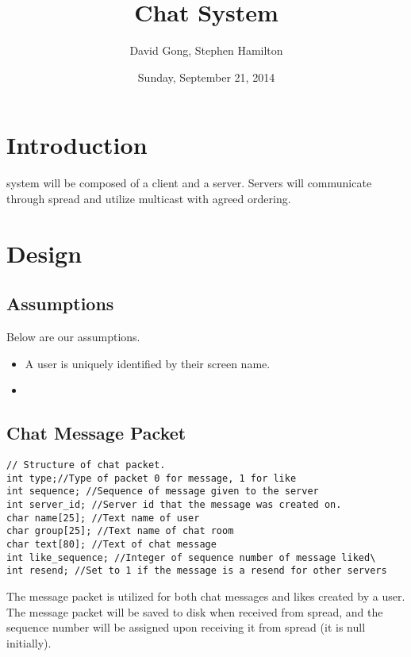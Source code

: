 \documentclass[12pt,journal,compsoc]{IEEEtran}
\begin{document}
\title{Chat System}
\author{David Gong, Stephen Hamilton}%
\date{Sunday, September 21, 2014}
\maketitle
\section{Introduction}
 system will be composed of a client and a server.  Servers will communicate through spread and utilize multicast with agreed ordering.  
\section{Design}
\subsection{Assumptions}
Below are our assumptions.
\begin{itemize}
\item A user is uniquely identified by their screen name.
\item 
\end{itemize}
\subsection{Chat Message Packet}
\begin{lstlisting}
// Structure of chat packet.
int type;//Type of packet 0 for message, 1 for like
int sequence; //Sequence of message given to the server
int server_id; //Server id that the message was created on.
char name[25]; //Text name of user
char group[25]; //Text name of chat room
char text[80]; //Text of chat message
int like_sequence; //Integer of sequence number of message liked\
int resend; //Set to 1 if the message is a resend for other servers
\end{lstlisting}
The message packet is utilized for both chat messages and likes created by a user.  The message packet will be saved to disk when received from spread, and the sequence number will be assigned upon receiving it from spread (it is null initially).
\end{document}
